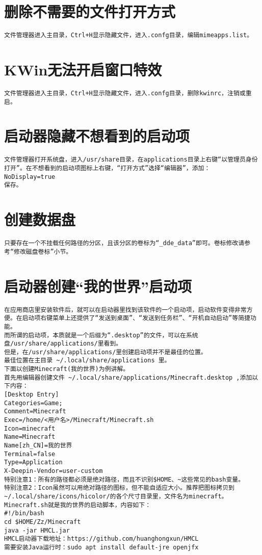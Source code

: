 \documentclass[a4paper,fontset=fandol,zihao=-4,linespread=1.2]{ctexbook}
\begin{document}
\section{删除不需要的文件打开方式}
\begin{lstlisting}
文件管理器进入主目录，Ctrl+H显示隐藏文件，进入.confg目录，编辑mimeapps.list。
\end{lstlisting}

\section{KWin无法开启窗口特效}
\begin{lstlisting}
文件管理器进入主目录，Ctrl+H显示隐藏文件，进入.confg目录，删除kwinrc，注销或重启。
\end{lstlisting}

\section{启动器隐藏不想看到的启动项}
\begin{lstlisting}
文件管理器打开系统盘，进入/usr/share目录，在applications目录上右键“以管理员身份打开”。在不想看到的启动项图标上右键，“打开方式”选择“编辑器”，添加：NoDisplay=true
保存。
\end{lstlisting}

\section{创建数据盘}
\begin{lstlisting}
只要存在一个不挂载任何路径的分区，且该分区的卷标为“_dde_data”即可。卷标修改请参考“修改磁盘卷标”小节。
\end{lstlisting}

\section{启动器创建“我的世界”启动项}
\begin{lstlisting}
在应用商店里安装软件后，就可以在启动器里找到该软件的一个启动项，启动软件变得非常方便。在启动项右键菜单上还提供了“发送到桌面”、“发送到任务栏”、“开机自动启动”等简捷功能。
而所谓的启动项，本质就是一个后缀为“.desktop”的文件，可以在系统盘/usr/share/applications/里看到。
但是，在/usr/share/applications/里创建启动项并不是最佳的位置。
最佳位置在主目录 ~/.local/share/applications 里。
下面以创建Minecraft(我的世界)为例讲解。
首先用编辑器创建文件 ~/.local/share/applications/Minecraft.desktop ,添加以下内容：
[Desktop Entry]
Categories=Game;
Comment=Minecraft
Exec=/home/<用户名>/Minecraft/Minecraft.sh
Icon=minecraft
Name=Minecraft
Name[zh_CN]=我的世界
Terminal=false
Type=Application
X-Deepin-Vendor=user-custom
特别注意1：所有的路径都必须是绝对路径，而且不识别$HOME、~这些常见的bash变量。
特别注意2：Icon虽然可以用绝对路径的图标，但不能自适应大小。推荐把图标拷贝到~/.local/share/icons/hicolor/的各个尺寸目录里，文件名为minecraft。
Minecraft.sh就是我的世界的启动脚本，内容如下：
#!/bin/bash
cd $HOME/Zz/Minecraft
java -jar HMCL.jar
HMCL启动器下载地址：https://github.com/huanghongxun/HMCL
需要安装Java运行时：sudo apt install default-jre openjfx
\end{lstlisting}
\end{document}
